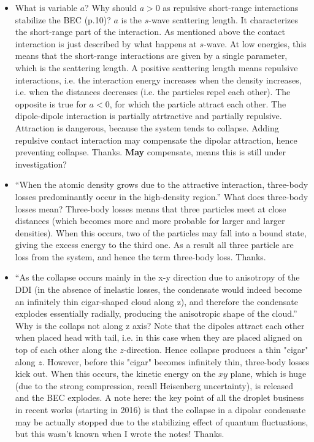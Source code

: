 \begin{itemize}
        \item What is variable $a$? Why should $a > 0$ as repulsive short-range interactions stabilize the BEC (p.10)?
        {\color{red}
            $a$ is the $s$-wave scattering length. It characterizes the short-range part of the interaction. As mentioned above the contact interaction is just described by what happens at $s$-wave.
            At low energies, this means that the short-range interactions are given by a single parameter, which is the scattering length. A positive scattering length means repulsive interactions, i.e. the interaction energy increases when the density increases, i.e. when the distances decreases (i.e. the particles repel each other). The opposite is true for $a<0$, for which the particle attract each other. The dipole-dipole interaction is partially atrtractive and partially repulsive. Attraction is dangerous, because the system tends to collapse. Adding repulsive contact interaction may compensate the dipolar attraction, hence preventing collapse.
        }
        {\color{green}
            Thanks. \textbf{May} compensate, means this is still under investigation?
        }

        \item ``When the atomic density grows due to the attractive interaction, three-body losses predominantly occur in the high-density region.'' What does three-body losses mean?
        {\color{red}
            Three-body losses means that three particles meet at close distances (which becomes more and more probable for larger and larger densities). When this occurs, two of the particles may
            fall into a bound state, giving the excess energy to the third one. As a result all three particle are loss from the system, and hence the term three-body loss.
        }
        {\color{green}
            Thanks.
        }

        \item ``As the collapse occurs mainly in the x-y direction due to anisotropy of the DDI (in the absence of inelastic losses, the condensate would indeed become an infinitely thin cigar-shaped cloud along z),
        and therefore the condensate explodes essentially radially, producing the anisotropic
        shape of the cloud.'' Why is the collaps not along z axis?
        {\color{red}
            Note that the dipoles attract each other when placed head with tail, i.e. in this case when they are placed aligned on top of each other along the $z$-direction. Hence collapse produces a thin "cigar" along $z$. However, before this "cigar" becomes infinitely thin, three-body losses kick out. When this occurs, the kinetic energy on the $xy$ plane, which is huge (due to the strong compression, recall Heisenberg uncertainty), is released and the BEC explodes. A note here: the key point of all the droplet business in recent works (starting in 2016) is that the collapse in a dipolar condensate may be actually stopped due to the stabilizing effect of quantum fluctuations, but this wasn't known when I wrote the notes!
        }
        {\color{green}
            Thanks.
        }
        

\end{itemize}
